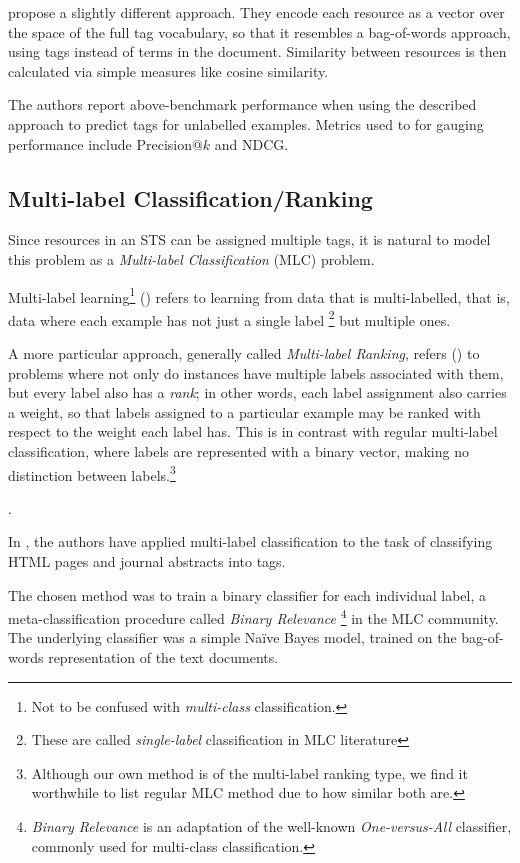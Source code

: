 \cite{auyeung_etal_2009} propose a slightly different approach. They encode each resource as a vector over the space of the full tag vocabulary, so that it resembles a bag-of-words approach, using tags instead of terms in the document. Similarity between resources is then calculated via simple measures like cosine similarity.

The authors report above-benchmark performance when using the described approach to predict tags for unlabelled examples. Metrics used to for gauging performance include Precision@$k$ and NDCG.


\subsection{Multi-label Classification/Ranking}

Since resources in an STS can be assigned multiple tags, it is natural to model this problem as a \textit{Multi-label Classification} (MLC) problem.

Multi-label learning\footnote{Not to be confused with \textit{multi-class} classification.} (\cite{tsoumakas_katakis_2007}) refers to learning from data that is multi-labelled, that is, data where each example has not just a single label \footnote{These are called \textit{single-label} classification in MLC literature} but multiple ones.

A more particular approach, generally called \textit{Multi-label Ranking}, refers (\cite{illig_etal_2011}) to problems where not only do instances have multiple labels associated with them, but every label also has a \textit{rank}; in other words, each label assignment also carries a weight, so that labels assigned to a particular example may be ranked with respect to the weight each label has. This is in contrast with regular multi-label classification, where labels are represented with a binary vector, making no distinction between labels.\footnote{Although our own method is of the multi-label ranking type, we find it worthwhile to list regular MLC method due to how similar both are.}

.

In \cite{katakis_etal_2008}, the authors have applied multi-label classification to the task of classifying HTML pages and journal abstracts into tags.

The chosen method was to train a binary classifier for each individual label, a meta-classification procedure called \textit{Binary Relevance} \footnote{\textit{Binary Relevance} is an adaptation of the well-known \textit{One-versus-All} \citep{rifkin_klautau_2004} classifier, commonly used for multi-class classification.} in the MLC community. The underlying classifier was a simple Naïve Bayes model, trained on the bag-of-words representation of the text documents.

